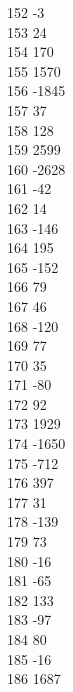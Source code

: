 { 152	-3 \\
 153	24 \\
 154	170 \\
 155	1570 \\
 156	-1845 \\
 157	37 \\
 158	128 \\
 159	2599 \\
 160	-2628 \\
 161	-42 \\
 162	14 \\
 163	-146 \\
 164	195 \\
 165	-152 \\
 166	79 \\
 167	46 \\
 168	-120 \\
 169	77 \\
 170	35 \\
 171	-80 \\
 172	92 \\
 173	1929 \\
 174	-1650 \\
 175	-712 \\
 176	397 \\
 177	31 \\
 178	-139 \\
 179	73 \\
 180	-16 \\
 181	-65 \\
 182	133 \\
 183	-97 \\
 184	80 \\
 185	-16 \\
 186	1687 \\
}
